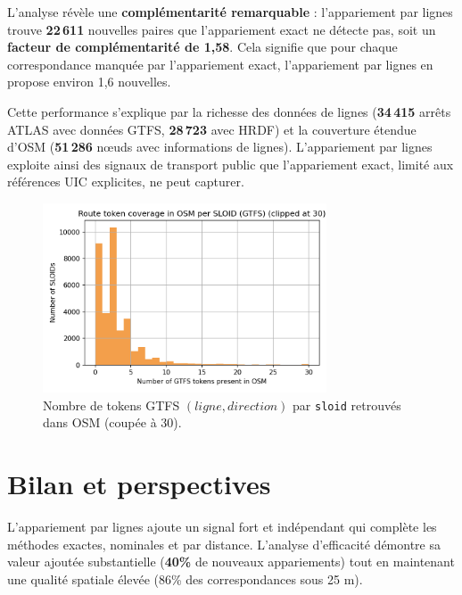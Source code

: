 L'analyse révèle une \textbf{complémentarité remarquable} : l'appariement par lignes trouve \textbf{22\,611} nouvelles paires que l'appariement exact ne détecte pas, soit un \textbf{facteur de complémentarité de 1,58}. Cela signifie que pour chaque correspondance manquée par l'appariement exact, l'appariement par lignes en propose environ 1,6 nouvelles.

Cette performance s'explique par la richesse des données de lignes (\textbf{34\,415} arrêts ATLAS avec données GTFS, \textbf{28\,723} avec HRDF) et la couverture étendue d'OSM (\textbf{51\,286} nœuds avec informations de lignes). L'appariement par lignes exploite ainsi des signaux de transport public que l'appariement exact, limité aux références UIC explicites, ne peut capturer.

\begin{figure}[H]
  \centering
  \includegraphics[width=0.75\textwidth]{../figures/chap4/hist_route_token_coverage_per_sloid.png}
  \caption{Nombre de tokens GTFS \((ligne, direction)\) par \texttt{sloid} retrouvés dans OSM (coupée à 30).}
\end{figure}


\section{Bilan et perspectives}

L'appariement par lignes ajoute un signal fort et indépendant qui complète les méthodes exactes, nominales et par distance. L'analyse d'efficacité démontre sa valeur ajoutée substantielle (\textbf{40\%} de nouveaux appariements) tout en maintenant une qualité spatiale élevée (86\% des correspondances sous 25 m).
